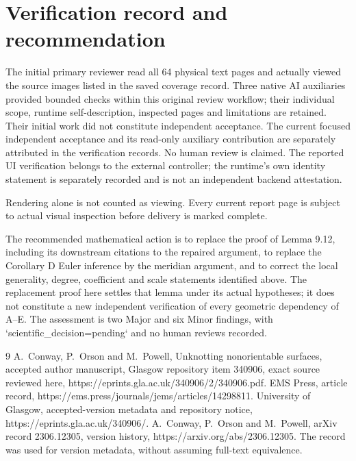 \documentclass[10pt]{article}
\begin{document}
\section*{Verification record and recommendation}
The initial primary reviewer read all 64 physical text pages and actually viewed the source images listed in the saved coverage record. Three native AI auxiliaries provided bounded checks within this original review workflow; their individual scope, runtime self-description, inspected pages and limitations are retained. Their initial work did not constitute independent acceptance. The current focused independent acceptance and its read-only auxiliary contribution are separately attributed in the verification records. No human review is claimed. The reported UI verification belongs to the external controller; the runtime’s own identity statement is separately recorded and is not an independent backend attestation.\par
Rendering alone is not counted as viewing. Every current report page is subject to actual visual inspection before delivery is marked complete.\par
The recommended mathematical action is to replace the proof of Lemma 9.12, including its downstream citations to the repaired argument, to replace the Corollary D Euler inference by the meridian argument, and to correct the local generality, degree, coefficient and scale statements identified above. The replacement proof here settles that lemma under its actual hypotheses; it does not constitute a new independent verification of every geometric dependency of A–E. The assessment is two Major and six Minor findings, with `scientific\_decision=pending` and no human reviews recorded.\par
9 A. Conway, P. Orson and M. Powell, Unknotting nonorientable surfaces, accepted author manuscript, Glasgow repository item 340906, exact source reviewed here, https://eprints.gla.ac.uk/340906/2/340906.pdf. EMS Press, article record, https://ems.press/journals/jems/articles/14298811. University of Glasgow, accepted-version metadata and repository notice, https://eprints.gla.ac.uk/340906/. A. Conway, P. Orson and M. Powell, arXiv record 2306.12305, version history, https://arxiv.org/abs/2306.12305. The record was used for version metadata, without assuming full-text equivalence.\par
\end{document}
